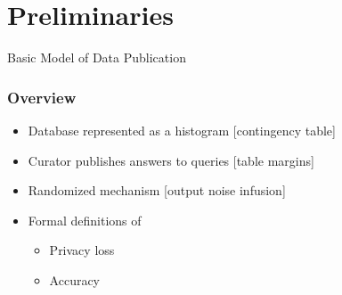 \section[Preliminaries]{Preliminaries}

\begin{frame}[allowframebreaks]%

\begin{center}
	{\Large Basic Model of Data Publication}
\end{center}



\end{frame}%
%

\begin{frame}[allowframebreaks]%
\frametitle{Overview}
\begin{itemize}
	\item Database represented as a histogram [contingency table] \vspace*{0.25in}
	\item Curator publishes answers to queries [table margins] \vspace*{0.25in}
	\item Randomized mechanism [output noise infusion] \vspace*{0.25in}
	\item Formal definitions of
	\begin{itemize}
		\item Privacy loss
		\item Accuracy
	\end{itemize}
\end{itemize}


\end{frame}%
%

